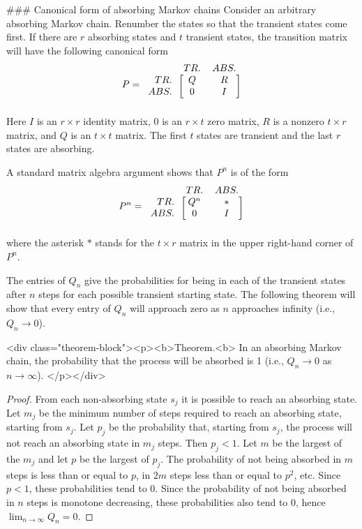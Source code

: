### Canonical form of absorbing Markov chains
Consider an arbitrary absorbing Markov chain. Renumber the states so that the transient states come first. If there are $r$ absorbing states and $t$ transient states, the transition matrix will have the following canonical form
$$\begin{equation}
    P = 
    \begin{blockarray}{rcc}
        & TR. & ABS. \\
    \begin{block}{r[cc]}
        TR. & Q &  R \\
        ABS. & 0 &  I \\
    \end{block}
    \end{blockarray}
\end{equation}$$
Here $I$ is an $r\times r$ identity matrix, $0$ is an $r\times t$ zero matrix, $R$ is a nonzero $t\times r$ matrix, and $Q$ is an $t\times t$ matrix. The first $t$ states are transient and the last $r$ states are absorbing.

A standard matrix algebra argument shows that $P^n$ is of the form
$$\begin{equation}
    P^n = 
    \begin{blockarray}{rcc}
        & TR. & ABS. \\
    \begin{block}{r[cc]}
        TR. & Q^n &  * \\
        ABS. & 0 &  I \\
    \end{block}
    \end{blockarray}
\end{equation}$$
where the asterisk $*$ stands for the $t\times r$ matrix in the upper right-hand corner of $P^n$. 

The entries of $Q_n$ give the probabilities for being in each of the transient states after $n$ steps for each possible transient starting state. The following theorem will show that every entry of $Q_n$ will approach zero as $n$ approaches infinity (i.e., $Q_n \to 0$).

<div class="theorem-block"><p><b>Theorem.<b> 
In an absorbing Markov chain, the probability that the process will be absorbed is 1 (i.e., $Q_n \to 0$ as $n \to \infty$).
</p></div>

\begin{proof}
From each non-absorbing state $s_j$ it is possible to reach an absorbing state. Let $m_j$ be the minimum number of steps required to reach an absorbing state, starting from $s_j$. Let $p_j$ be the probability that, starting from $s_j$, the process will not reach an absorbing state in $m_j$ steps. Then $p_j < 1$. Let $m$ be the largest of the $m_j$ and let $p$ be the largest of $p_j$. The probability of not being absorbed in $m$ steps is less than or equal to $p$, in $2m$ steps less than or equal to $p^2$, etc. Since $p < 1$, these probabilities tend to 0. Since the probability of not being absorbed in $n$ steps is monotone decreasing, these probabilities also tend to 0, hence $\lim_{n\to\infty} Q_n = 0$.
\end{proof}

